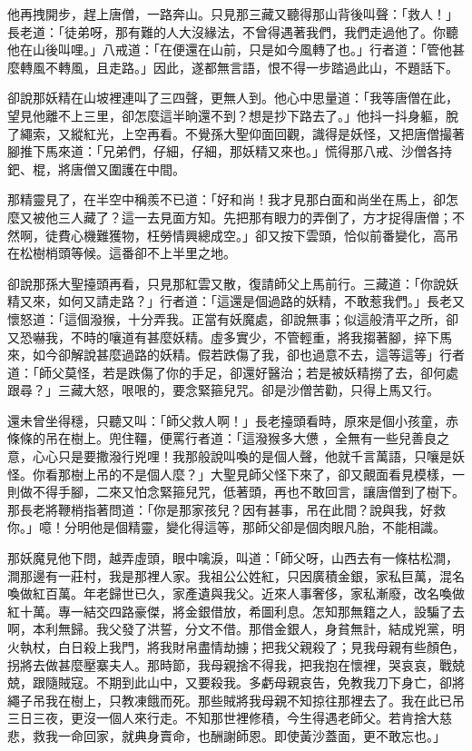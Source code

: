 他再拽開步，趕上唐僧，一路奔山。只見那三藏又聽得那山背後叫聲：「救人！」長老道：「徒弟呀，那有難的人大沒緣法，不曾得遇著我們，我們走過他了。你聽他在山後叫哩。」八戒道：「在便還在山前，只是如今風轉了也。」行者道：「管他甚麼轉風不轉風，且走路。」因此，遂都無言語，恨不得一步踏過此山，不題話下。

卻說那妖精在山坡裡連叫了三四聲，更無人到。他心中思量道：「我等唐僧在此，望見他離不上三里，卻怎麼這半晌還不到？想是抄下路去了。」他抖一抖身軀，脫了繩索，又縱紅光，上空再看。不覺孫大聖仰面回觀，識得是妖怪，又把唐僧撮著腳推下馬來道：「兄弟們，仔細，仔細，那妖精又來也。」慌得那八戒、沙僧各持鈀、棍，將唐僧又圍護在中間。

那精靈見了，在半空中稱羨不已道：「好和尚！我才見那白面和尚坐在馬上，卻怎麼又被他三人藏了？這一去見面方知。先把那有眼力的弄倒了，方才捉得唐僧；不然啊，徒費心機難獲物，枉勞情興總成空。」卻又按下雲頭，恰似前番變化，高吊在松樹梢頭等候。這番卻不上半里之地。

卻說那孫大聖擡頭再看，只見那紅雲又散，復請師父上馬前行。三藏道：「你說妖精又來，如何又請走路？」行者道：「這還是個過路的妖精，不敢惹我們。」長老又懷怒道：「這個潑猴，十分弄我。正當有妖魔處，卻說無事；似這般清平之所，卻又恐嚇我，不時的嚷道有甚麼妖精。虛多實少，不管輕重，將我搊著腳，捽下馬來，如今卻解說甚麼過路的妖精。假若跌傷了我，卻也過意不去，這等這等」行者道：「師父莫怪，若是跌傷了你的手足，卻還好醫治；若是被妖精撈了去，卻何處跟尋？」三藏大怒，哏哏的，要念緊箍兒咒。卻是沙僧苦勸，只得上馬又行。

還未曾坐得穩，只聽又叫：「師父救人啊！」長老擡頭看時，原來是個小孩童，赤條條的吊在樹上。兜住韁，便罵行者道：「這潑猴多大憊𪬯，全無有一些兒善良之意，心心只是要撒潑行兇哩！我那般說叫喚的是個人聲，他就千言萬語，只嚷是妖怪。你看那樹上吊的不是個人麼？」大聖見師父怪下來了，卻又覿面看見模樣，一則做不得手腳，二來又怕念緊箍兒咒，低著頭，再也不敢回言，讓唐僧到了樹下。那長老將鞭梢指著問道：「你是那家孩兒？因有甚事，吊在此間？說與我，好救你。」噫！分明他是個精靈，變化得這等，那師父卻是個肉眼凡胎，不能相識。

那妖魔見他下問，越弄虛頭，眼中噙淚，叫道：「師父呀，山西去有一條枯松澗，澗那邊有一莊村，我是那裡人家。我祖公公姓紅，只因廣積金銀，家私巨萬，混名喚做紅百萬。年老歸世已久，家產遺與我父。近來人事奢侈，家私漸廢，改名喚做紅十萬。專一結交四路豪傑，將金銀借放，希圖利息。怎知那無籍之人，設騙了去啊，本利無歸。我父發了洪誓，分文不借。那借金銀人，身貧無計，結成兇黨，明火執杖，白日殺上我門，將我財帛盡情劫擄；把我父親殺了；見我母親有些顏色，拐將去做甚麼壓寨夫人。那時節，我母親捨不得我，把我抱在懷裡，哭哀哀，戰兢兢，跟隨賊寇。不期到此山中，又要殺我。多虧母親哀告，免教我刀下身亡，卻將繩子吊我在樹上，只教凍餓而死。那些賊將我母親不知掠往那裡去了。我在此已吊三日三夜，更沒一個人來行走。不知那世裡修積，今生得遇老師父。若肯捨大慈悲，救我一命回家，就典身賣命，也酬謝師恩。即使黃沙蓋面，更不敢忘也。」

